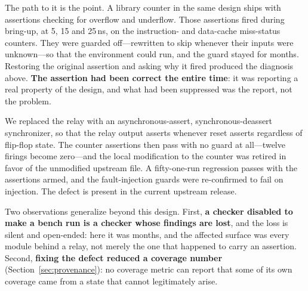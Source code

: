 \documentclass[conference]{IEEEtran}
\begin{document}
The path to it is the point. A library counter in the same design ships
with assertions checking for overflow and underflow. Those assertions
fired during bring-up, at 5, 15 and 25\,ns, on the instruction- and
data-cache miss-status counters. They were guarded off---rewritten to
skip whenever their inputs were unknown---so that the environment could
run, and the guard stayed for months. Restoring the original assertion
and asking why it fired produced the diagnosis above. \textbf{The
	assertion had been correct the entire time}: it was reporting a real
property of the design, and what had been suppressed was the report, not
the problem.

We replaced the relay with an asynchronous-assert, synchronous-deassert
synchronizer, so that the relay output asserts whenever reset asserts
regardless of flip-flop state. The counter assertions then pass with no
guard at all---twelve firings become zero---and the local modification
to the counter was retired in favor of the unmodified upstream file. A
fifty-one-run regression passes with the assertions armed, and the
fault-injection guards were re-confirmed to fail on injection. The
defect is present in the current upstream release.

Two observations generalize beyond this design. First, \textbf{a
	checker disabled to make a bench run is a checker whose findings are
	lost}, and the loss is silent and open-ended: here it was months, and
the affected surface was every module behind a relay, not merely the one
that happened to carry an assertion. Second, \textbf{fixing the defect
	reduced a coverage number}
(Section~\ref{sec:provenance}): no coverage metric can report that some
of its own coverage came from a state that cannot legitimately arise.
\end{document}
